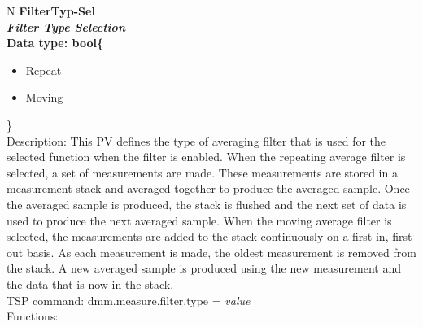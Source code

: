 \documentclass[openany]{article}
\begin{document}
		\begin{tabular}{N}
			\hline
			\bfseries FilterTyp-Sel\label{pv:filtertyp-sel} \\ \hline
			\emph{Filter Type Selection} \\
			Data type: bool\{\begin{itemize}[noitemsep]
				\item[] Repeat
				\item[] Moving
			\end{itemize}\} \\
			Description: This PV defines the type of averaging filter that is used for the selected function when the filter is enabled. When the repeating average filter is selected, a set of measurements are made. These measurements are stored in a measurement stack and averaged together to produce the averaged sample. Once the averaged sample is produced, the stack is flushed and the next set of data is used to produce the next averaged sample. When the moving average filter is selected, the measurements are added to the stack continuously on a first-in, first-out basis. As each measurement is made, the oldest measurement is removed from the stack. A new averaged sample is produced using the new measurement and the data that is now in the stack. \\
			TSP command: dmm.measure.filter.type = \emph{value} \\
			Functions: \\
			\arrayrulecolor{\FuncTableBorderColor}

		\end{tabular}
\end{document}
